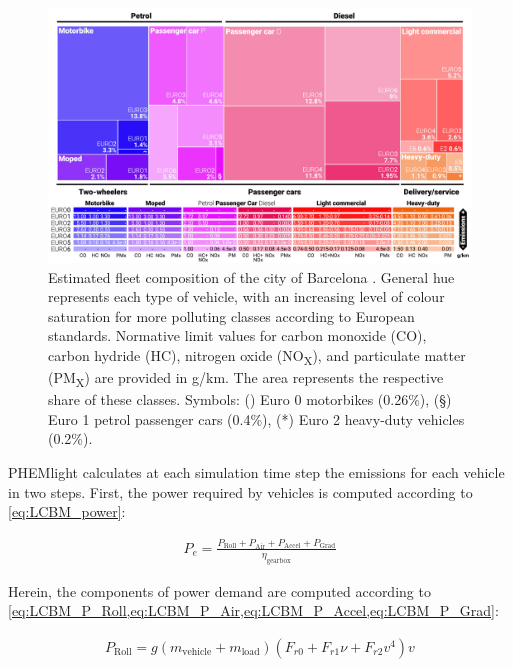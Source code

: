 \begin{figure}[htbp!]
    \centering
    \includegraphics[width=1\textwidth]{LCBM_fig03.jpg}
    \caption{Estimated fleet composition of the city of Barcelona \citep{Rodriguez-Rey2022,AjuntamentdeBarcelona2017}. General hue represents each type of vehicle, with an increasing level of colour saturation for more polluting classes according to European standards. Normative limit values for carbon monoxide (CO), carbon hydride (HC), nitrogen oxide (NO\textsubscript{X}), and particulate matter (PM\textsubscript{X}) are provided in g/km. The area represents the respective share of these classes. Symbols: (\texttildelow) Euro 0 motorbikes (0.26\%), (§) Euro 1 petrol passenger cars (0.4\%), (*) Euro 2 heavy-duty vehicles (0.2\%).}
   \label{fig:LCBM_fig03}
\end{figure}

PHEMlight calculates at each simulation time step the emissions for each vehicle in two steps. First, the power required by vehicles is computed according to \autoref{eq:LCBM_power}:

\begin{align}
   P_e = \frac{P_{\text{Roll}} + P_{\text{Air}} + P_{\text{Accel}} + P_{\text{Grad}}}{\eta_{\text{gearbox}}} \label{eq:LCBM_power}
\end{align}

Herein, the components of power demand are computed according to \cref{eq:LCBM_P_Roll,eq:LCBM_P_Air,eq:LCBM_P_Accel,eq:LCBM_P_Grad}:

\begin{align}
   P_{\text{Roll}} = g (m_{\text{vehicle}} + m_{\text{load}}) (F_{r0} + F_{r1} \nu + F_{r2} v^4) v \label{eq:LCBM_P_Roll}
\end{align}

